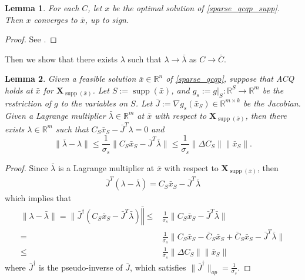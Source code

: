 \documentclass[11pt]{amsart}
\theoremstyle{plain}
\newtheorem{lem}{Lemma}[section]
\theoremstyle{definition}
\theoremstyle{remark}
\newcommand{\vX}{{\mathbf{X}}}
\newcommand{\RR}{\mathbb{R}}
\DeclareMathOperator{\supp}{supp}
\begin{document}
    \begin{lem}\label{lem:primal_convergence}
        For each \(C\), let \(x\) be the optimal solution of \eqref{sparse_qcqp_supp}. Then \(x\) converges to \(\bar x\), up to sign.
    \end{lem}
    \begin{proof}
        See .
    \end{proof}

    Then we show that there exists \(\lambda\) such that \(\lambda\rightarrow\bar \lambda\) as \(C\rightarrow \bar C\).
	
	\begin{lem}\label{lem:dual_stability}
		Given a feasible solution \(\bar x\in\RR^n\) of \eqref{sparse_qcqp},
		suppose that ACQ holds at $\bar x$ for
		\(\vX_{\supp(\bar x)}\).
        Let \(S:=\supp(\bar x)\), and \(g_s := g|_{S} : \RR^S \to \RR^m \) be the restriction of $g$ to the variables on $S$.
        Let \(\bar J:=\nabla g_s(\bar x_S) \in \RR^{m \times k}\) be the Jacobian. 
		Given a Lagrange multiplier \(\bar \lambda \in \RR^m\) at \(\bar x\) with respect to \(\vX_{\supp (\bar x)}\),
		then there exists \(\lambda \in \RR^m\) such that \(C_S\bar x_S - \bar J^T\lambda =0\) and
		\begin{equation}
			\|\bar\lambda -  \lambda\| \leq \frac{1}{\sigma_s} \|C_S\bar x_S -\bar J^T\bar\lambda\|\leq \frac{1}{\sigma_s}\|\Delta C_S\|\|\bar x_S \|.
		\end{equation}
	\end{lem}
	\begin{proof}
		Since \(\bar\lambda\) is a Lagrange multiplier at \(\bar x\) with respect to \(\vX_{\supp (\bar x)}\), then
		\begin{equation}
			\begin{split}
				\bar J^T(\lambda- \bar\lambda)= C_S\bar x_S - \bar J^T \bar \lambda
			\end{split}
		\end{equation}
		which implies that 
        \begin{equation}
            \begin{split}
                \|\lambda- \bar\lambda\| = \|\bar J^\dagger(C_S\bar x_S - \bar J^T\bar\lambda)\bar\| \leq &  \frac{1}{\sigma_s} \|C_S\bar x_S -\bar J^T\bar\lambda\|\\
                = & \frac{1}{\sigma_s}\|C_S\bar x_S - \bar C_S\bar x_S + \bar C_S \bar x_S - \bar J^T\bar\lambda\|\\
                \leq & \frac{1}{\sigma_s}\|\Delta C_S\|\|\bar x_S \|
            \end{split}
        \end{equation}
		where \(\bar J^\dagger\) is the pseudo-inverse of \(\bar J\), which satisfies \(\|\bar J^\dagger\|_{op} = \frac{1}{\sigma_s}\).
	\end{proof}
\end{document}
